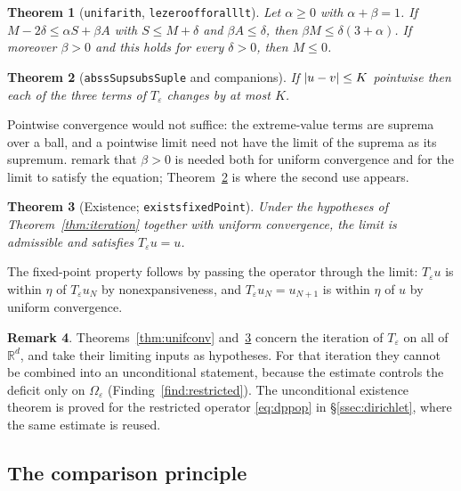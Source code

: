 \documentclass[11pt,reqno]{amsart}
\newcommand{\LEANREF}[1]{\texttt{\small\def\_{\textunderscore\allowbreak}#1}}
\newcommand{\R}{\mathbb{R}}
\newcommand{\eps}{\varepsilon}
\newcommand{\Op}{T_\eps}
\DeclarePairedDelimiter{\abs}{\lvert}{\rvert}
\theoremstyle{plain}
\newtheorem{theorem}{Theorem}[section]
\theoremstyle{definition}
\newtheorem{remark}[theorem]{Remark}
\begin{document}
\begin{theorem}[\LEANREF{unif\_arith},
\LEANREF{le\_zero\_of\_forall\_lt}]\label{thm:unifarith}
Let $\alpha \ge 0$ with $\alpha+\beta=1$. If
$M - 2\delta \le \alpha S + \beta A$ with $S \le M+\delta$ and
$\beta A \le \delta$, then $\beta M \le \delta(3+\alpha)$. If moreover
$\beta>0$ and this holds for every $\delta>0$, then $M \le 0$.
\end{theorem}

\begin{theorem}[\LEANREF{abs\_sSup\_sub\_sSup\_le} and
companions]\label{thm:unifcont}
If $\abs{u-v} \le K$ pointwise then each of the three terms of $\Op$ changes by
at most $K$.
\end{theorem}

Pointwise convergence would not suffice: the extreme-value terms are suprema
over a ball, and a pointwise limit need not have the limit of the suprema as
its supremum. \cite{LPS14} remark that $\beta>0$ is needed both for uniform
convergence and for the limit to satisfy the equation;
Theorem~\ref{thm:unifcont} is where the second use appears.

\begin{theorem}[Existence; \LEANREF{exists\_fixedPoint}]\label{thm:existence}
Under the hypotheses of Theorem~\ref{thm:iteration} together with uniform
convergence, the limit is admissible and satisfies $\Op u = u$.
\end{theorem}

The fixed-point property follows by passing the operator through the limit:
$\Op u$ is within $\eta$ of $\Op u_N$ by nonexpansiveness, and
$\Op u_N = u_{N+1}$ is within $\eta$ of $u$ by uniform convergence.

\begin{remark}\label{rem:wholespace}
Theorems~\ref{thm:unifconv} and~\ref{thm:existence} concern the iteration of
$\Op$ on all of $\R^d$, and take their limiting inputs as hypotheses. For that
iteration they cannot be combined into an unconditional statement, because the
estimate controls the deficit only on $\Omega_\eps$
(Finding~\ref{find:restricted}). The unconditional existence theorem is proved
for the restricted operator \eqref{eq:dppop} in \S\ref{ssec:dirichlet},
where the same estimate is reused.
\end{remark}

\subsection{The comparison principle}\label{ssec:comparison}
\end{document}
